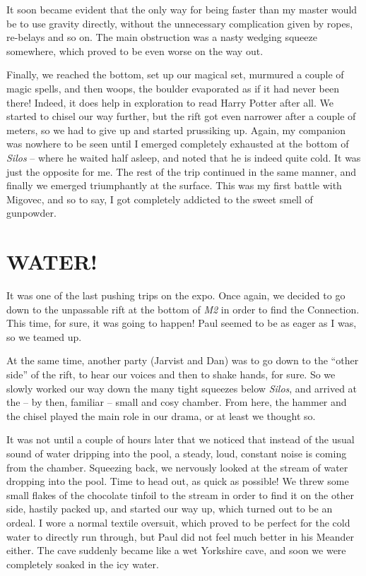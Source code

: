 It soon became evident that the only way for being faster than my master
would be to use gravity directly, without the unnecessary complication
given by ropes, re-belays and so on. The main obstruction was a nasty
wedging squeeze somewhere, which proved to be even worse on the way out.

Finally, we reached the bottom, set up our magical set, murmured a
couple of magic spells, and then woops, the boulder evaporated as if it
had never been there! Indeed, it does help in exploration to read Harry
Potter after all. We started to chisel our way further, but the rift got
even narrower after a couple of meters, so we had to give up and started
prussiking up. Again, my companion was nowhere to be seen until I
emerged completely exhausted at the bottom of \emph{Silos} -- where he
waited half asleep, and noted that he is indeed quite cold. It was just
the opposite for me. The rest of the trip continued in the same manner,
and finally we emerged triumphantly at the surface. This was my first
battle with Migovec, and so to say, I got completely addicted to the
sweet smell of gunpowder.


\hypertarget{water}{%
\section{WATER!}\label{water}}

It was one of the last pushing trips on the expo. Once again, we decided
to go down to the unpassable rift at the bottom of \emph{M2} in order to
find the Connection. This time, for sure, it was going to happen! Paul
seemed to be as eager as I was, so we teamed up.

At the same time, another party (Jarvist and Dan) was to go down to the
``other side'' of the rift, to hear our voices and then to shake hands,
for sure. So we slowly worked our way down the many tight squeezes below
\emph{Silos}, and arrived at the -- by then, familiar -- small and cosy
chamber. From here, the hammer and the chisel played the main role in
our drama, or at least we thought so.

It was not until a couple of hours later that we noticed that instead of
the usual sound of water dripping into the pool, a steady, loud,
constant noise is coming from the chamber. Squeezing back, we nervously
looked at the stream of water dropping into the pool. Time to head out,
as quick as possible! We threw some small flakes of the chocolate
tinfoil to the stream in order to find it on the other side, hastily
packed up, and started our way up, which turned out to be an ordeal. I
wore a normal textile oversuit, which proved to be perfect for the cold
water to directly run through, but Paul did not feel much better in his
Meander either. The cave suddenly became like a wet Yorkshire cave, and
soon we were completely soaked in the icy water.


